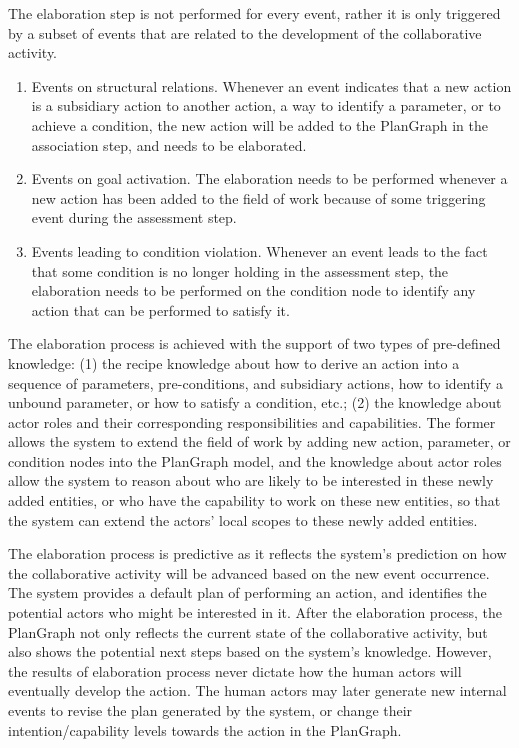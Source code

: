 The elaboration step is not performed for every event, rather it is only triggered by a subset of events that are related to the development of the collaborative activity. 
\begin{enumerate}
	\item Events on structural relations. Whenever an event indicates that a new action is a subsidiary action to another action, a way to identify a parameter, or to achieve a condition, the new action will be added to the PlanGraph in the association step, and needs to be elaborated.
	\item Events on goal activation. The elaboration needs to be performed whenever a new action has been added to the field of work because of some triggering event during the assessment step.
	\item Events leading to condition violation. Whenever an event leads to the fact that some condition is no longer holding in the assessment step, the elaboration needs to be performed on the condition node to identify any action that can be performed to satisfy it.
\end{enumerate}

The elaboration process is achieved with the support of two types of pre-defined knowledge: (1) the recipe knowledge about how to derive an action into a sequence of parameters, pre-conditions, and subsidiary actions, how to identify a unbound parameter, or how to satisfy a condition, etc.; (2) the knowledge about actor roles and their corresponding responsibilities and capabilities. The former allows the system to extend the field of work by adding new action, parameter, or condition nodes into the PlanGraph model, and the knowledge about actor roles allow the system to reason about who are likely to be interested in these newly added entities, or who have the capability to work on these new entities, so that the system can extend the actors' local scopes to these newly added entities.

The elaboration process is predictive as it reflects the system's prediction on how the collaborative activity will be advanced based on the new event occurrence. The system provides a default plan of performing an action, and identifies the potential actors who might be interested in it. After the elaboration process, the PlanGraph not only reflects the current state of the collaborative activity, but also shows the potential next steps based on the system's knowledge. However, the results of elaboration process never dictate how the human actors will eventually develop the action. The human actors may later generate new internal events to revise the plan generated by the system, or change their intention/capability levels towards the action in the PlanGraph.
